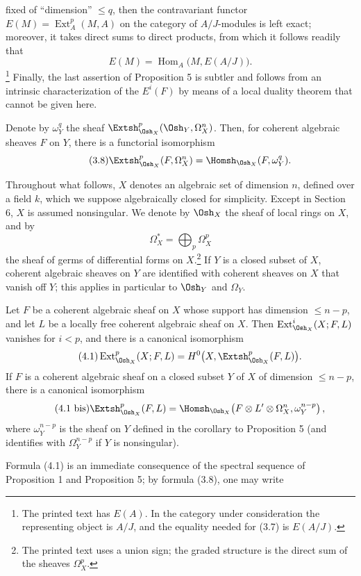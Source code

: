 fixed of “dimension” $\leq q$, then the contravariant functor
$E(M)=\operatorname{Ext}_{A}^{p}(M,A)$ on the category of $A/J$-modules is left
exact; moreover, it takes direct sums to direct products, from which it follows
readily that
\[
  E(M)=\operatorname{Hom}_{A}\bigl(M,E(A/J)\bigr).
\]
\footnote{The printed text has $E(A)$. In the category under consideration the
representing object is $A/J$, and the equality needed for (3.7) is $E(A/J)$.}
Finally, the last assertion of Proposition 5 is subtler and follows from an
intrinsic characterization of the $E^{i}(F)$ by means of a local duality theorem
that cannot be given here.

 Denote by $\omega_Y^{q}$ the sheaf
$\Extsh_{\Osh_X}^{p}(\Osh_Y,\Omega_X^{n})$. Then, for coherent algebraic sheaves
$F$ on $Y$, there is a functorial isomorphism
\begin{equation}\tag{3.8}
  \Extsh_{\Osh_X}^{p}(F,\Omega_X^{n})
  =\Homsh_{\Osh_X}(F,\omega_Y^{q}).
\end{equation}


Throughout what follows, $X$ denotes an algebraic set of dimension $n$, defined
over a field $k$, which we suppose algebraically closed for simplicity. Except
in Section 6, $X$ is assumed nonsingular. We denote by $\Osh_X$ the sheaf of
local rings on $X$, and by
\[
  \Omega_X^{*}=\bigoplus_p\Omega_X^{p}
\]
the sheaf of germs of differential forms on $X$.\footnote{The printed text uses
a union sign; the graded structure is the direct sum of the sheaves
$\Omega_X^p$.} If $Y$ is a closed subset of $X$, coherent algebraic sheaves on
$Y$ are identified with coherent sheaves on $X$ that vanish off $Y$; this
applies in particular to $\Osh_Y$ and $\Omega_Y$.

 Let $F$ be a coherent algebraic sheaf on $X$ whose support
has dimension $\leq n-p$, and let $L$ be a locally free coherent algebraic sheaf
on $X$. Then $\operatorname{Ext}_{\Osh_X}^{i}(X;F,L)$ vanishes for $i<p$, and
there is a canonical isomorphism
\begin{equation}\tag{4.1}
  \operatorname{Ext}_{\Osh_X}^{p}(X;F,L)
  =H^{0}\bigl(X,\Extsh_{\Osh_X}^{p}(F,L)\bigr).
\end{equation}
If $F$ is a coherent algebraic sheaf on a closed subset $Y$ of $X$ of dimension
$\leq n-p$, there is a canonical isomorphism
\begin{equation}\tag{4.1 bis}
  \Extsh_{\Osh_X}^{p}(F,L)
  =\Homsh_{\Osh_X}\!\left(
    F\otimes L'\otimes\Omega_X^{n},\omega_Y^{n-p}
  \right),
\end{equation}
where $\omega_Y^{n-p}$ is the sheaf on $Y$ defined in the corollary to
Proposition 5 (and identifies with $\Omega_Y^{n-p}$ if $Y$ is nonsingular).

Formula (4.1) is an immediate consequence of the spectral sequence of
Proposition 1 and Proposition 5; by formula (3.8), one may write

